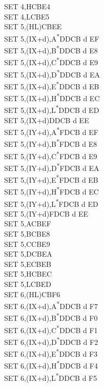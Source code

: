 \documentclass[twoside,openright,a4paper]{book}
\begin{document}
\begin{multicols}{3}
{\begin{tabbing}
	SET 4,H\>CBE4\\
	SET 4,L\>CBE5\\
	SET 5,(HL)\>CBEE\\
	SET 5,(IX+d),A\textsuperscript{*}\>DDCB d EF\\
	SET 5,(IX+d),B\textsuperscript{*}\>DDCB d E8\\
	SET 5,(IX+d),C\textsuperscript{*}\>DDCB d E9\\
	SET 5,(IX+d),D\textsuperscript{*}\>DDCB d EA\\
	SET 5,(IX+d),E\textsuperscript{*}\>DDCB d EB\\
	SET 5,(IX+d),H\textsuperscript{*}\>DDCB d EC\\
	SET 5,(IX+d),L\textsuperscript{*}\>DDCB d ED\\
	SET 5,(IX+d)\>DDCB d EE\\
	SET 5,(IY+d),A\textsuperscript{*}\>FDCB d EF\\
	SET 5,(IY+d),B\textsuperscript{*}\>FDCB d E8\\
	SET 5,(IY+d),C\textsuperscript{*}\>FDCB d E9\\
	SET 5,(IY+d),D\textsuperscript{*}\>FDCB d EA\\
	SET 5,(IY+d),E\textsuperscript{*}\>FDCB d EB\\
	SET 5,(IY+d),H\textsuperscript{*}\>FDCB d EC\\
	SET 5,(IY+d),L\textsuperscript{*}\>FDCB d ED\\
	SET 5,(IY+d)\>FDCB d EE\\
	SET 5,A\>CBEF\\
	SET 5,B\>CBE8\\
	SET 5,C\>CBE9\\
	SET 5,D\>CBEA\\
	SET 5,E\>CBEB\\
	SET 5,H\>CBEC\\
	SET 5,L\>CBED\\
	SET 6,(HL)\>CBF6\\
	SET 6,(IX+d),A\textsuperscript{*}\>DDCB d F7\\
	SET 6,(IX+d),B\textsuperscript{*}\>DDCB d F0\\
	SET 6,(IX+d),C\textsuperscript{*}\>DDCB d F1\\
	SET 6,(IX+d),D\textsuperscript{*}\>DDCB d F2\\
	SET 6,(IX+d),E\textsuperscript{*}\>DDCB d F3\\
	SET 6,(IX+d),H\textsuperscript{*}\>DDCB d F4\\
	SET 6,(IX+d),L\textsuperscript{*}\>DDCB d F5\\

\end{tabbing}}
\end{multicols}
\end{document}
